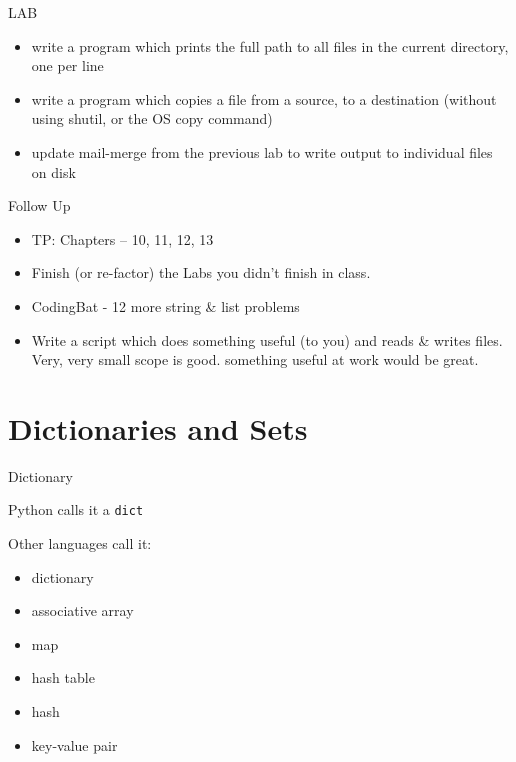 \documentclass{beamer}
\begin{document}
\begin{frame}{LAB}

\begin{itemize}
  \item write a program which prints the full path to all files in the current
        directory, one per line
  \item write a program which copies a file from a source, to a
        destination (without using shutil, or the OS copy command)
   \item update mail-merge from the previous lab to write output
         to individual files on disk
\end{itemize}

\end{frame}

\begin{frame}{Follow Up}

\begin{itemize}
  \item TP: Chapters -- 10, 11, 12, 13
  \item Finish (or re-factor) the Labs you didn't finish in class.
  \item CodingBat - 12 more string \& list problems
  \item Write a script which does something useful (to you) and reads \& writes
        files. Very, very small scope is good. something useful at work would
        be great.
\end{itemize}

\end{frame}

\section{Dictionaries and Sets}

\begin{frame}[fragile]{Dictionary}

{\Large Python calls it a \verb|dict| }

\vfill
{\Large Other languages call it:}
\begin{itemize}
  \item dictionary
  \item associative array
  \item map
  \item hash table
  \item hash
  \item key-value pair
\end{itemize}

\vfill

\end{frame} 
\end{document}
